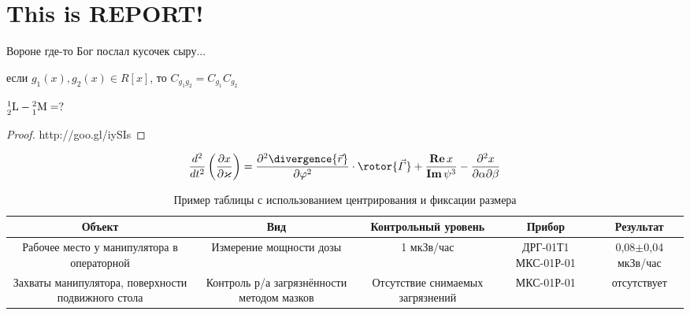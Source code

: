\documentclass[14pt,final,titlepage]{hedreport}
\begin{document}
	\section{This is REPORT!}
	\begin{proposition}
		Вороне где-то Бог послал кусочек сыру...
	\end{proposition}
	\begin{comment}
		наверное TCP/IP пакетом
	\end{comment}
	\begin{lemma}
		если \( g_1(x), g_2(x) \in R[x] \),
		то \( C_{g_1g_2} = C_{g_1} C_{g_2} \)
	\end{lemma}
	\begin{solution}
		\( \nucleus{1}{2}{L} - \nucleus{2}{1}{M} = ? \)
	\end{solution}
	\begin{proof}
		http://goo.gl/iySIs
	\end{proof}
	\[
		\dder{}{t}\left( \pder{x}{\kappa} \right) =
			\ppder{\divergence{\vec{r}}}{\phi}\cdot\rotor{\vec\Gamma} +
			\frac{\Re{x}}{\Im{\psi^3}} - \pcder{x}{\alpha}{\beta}
	\]
	\begin{table}[ht]
		\centering
		\caption{Пример таблицы с использованием центрирования
			и фиксации размера}
		\begin{tabular}{|C{.2}|C{.2}|C{.17}|C{.18}|C{.15}|}
			\hline
			Объект & Вид & Контрольный уровень & Прибор & Результат \\ \hline
			Рабочее место у манипулятора в операторной
			& Измерение мощности дозы
			& 1 мкЗв/час & ДРГ-01Т1 МКС-01Р-01
			& 0,08\( \pm \)0,04 мкЗв/час \\ \hline
			Захваты манипулятора, поверхности подвижного стола
			& Контроль р/а загрязнённости методом мазков
			& Отсутствие снимаемых загрязнений
			& МКС-01Р-01 & отсутствует \\ \hline
		\end{tabular}
	\end{table}
\end{document}
